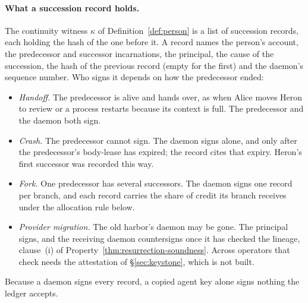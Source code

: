 \documentclass[11pt,a4paper]{article}
\theoremstyle{definition}
\begin{document}
\paragraph{What a succession record holds.}
The continuity witness $\kappa$ of Definition~\ref{def:person} is a list of
succession records, each holding the hash of the one before it. A record names
the person's account, the predecessor and successor incarnations, the
principal, the cause of the succession, the hash of the previous record (empty
for the first) and the daemon's sequence number. Who signs it depends on how
the predecessor ended:
\begin{itemize}[leftmargin=1.4em,itemsep=1pt]
  \item \emph{Handoff.} The predecessor is alive and hands over, as when Alice
  moves Heron to review or a process restarts because its context is full. The
  predecessor and the daemon both sign.
  \item \emph{Crash.} The predecessor cannot sign. The daemon signs alone, and
  only after the predecessor's body-lease has expired; the record cites that
  expiry. Heron's first successor was recorded this way.
  \item \emph{Fork.} One predecessor has several successors. The daemon signs
  one record per branch, and each record carries the share of credit its
  branch receives under the allocation rule below.
  \item \emph{Provider migration.} The old harbor's daemon may be gone. The
  principal signs, and the receiving daemon countersigns once it has checked
  the lineage, clause~(i) of Property~\ref{thm:resurrection-soundness}. Across
  operators that check needs the attestation of \S\ref{sec:keystone}, which is
  not built.
\end{itemize}
Because a daemon signs every record, a copied agent key alone signs nothing
the ledger accepts.
\end{document}

